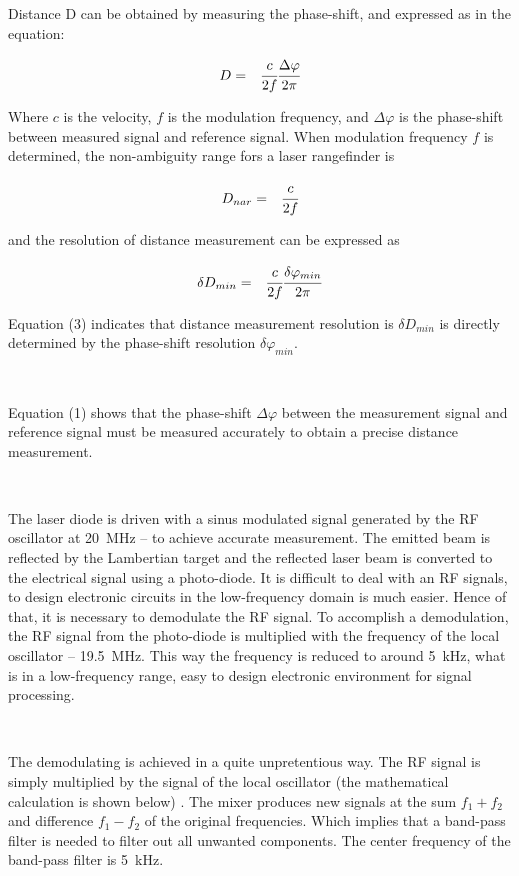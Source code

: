 \documentclass[fleqn]{article}
\begin{document}
Distance D can be obtained by measuring the phase-shift, and expressed as in the equation:

\begin{eqnarray}
    D&=&\cfrac{c}{2f}\cfrac{\Delta\varphi}{2\pi}
\end{eqnarray}

Where $c$ is the velocity, $f$ is the modulation frequency, and $\Delta\varphi$ is the phase-shift between measured signal and reference signal. When modulation frequency $f$ is determined, the non-ambiguity range fors a laser rangefinder is

\begin{eqnarray}
    D_{nar}&=&\cfrac{c}{2f}
\end{eqnarray}

and the resolution of distance measurement can be expressed as

\begin{eqnarray}
    \delta D_{min}&=&\cfrac{c}{2f}\cfrac{\delta\varphi_{min}}{2\pi}
\end{eqnarray}

Equation (3) indicates that distance measurement resolution is $\delta D_{min}$ is directly determined by the phase-shift resolution $\delta\varphi_{min}$.

~

Equation (1) shows that the phase-shift $\Delta\varphi$ between the measurement signal and reference signal must be measured accurately to obtain a precise distance measurement.

~

The laser diode is driven with a sinus modulated signal generated by the RF oscillator at 20 MHz – to achieve accurate measurement. The emitted beam is reflected by the Lambertian target and the reflected laser beam is converted to the electrical signal using a photo-diode. It is difficult to deal with an RF signals, to design electronic circuits in the low-frequency domain is much easier. Hence of that, it is necessary to demodulate the RF signal. To accomplish a demodulation, the  RF signal from the photo-diode is multiplied with the frequency of the local oscillator – 19.5 MHz. This way the frequency is reduced to around 5 kHz, what is in a low-frequency range, easy to design electronic environment for signal processing.

~

 The demodulating is achieved in a quite unpretentious way. The RF signal is simply multiplied by the signal of the local oscillator (the mathematical calculation is shown below) . The mixer produces  new signals at the sum $f_1 + f_2$ and difference $f_1 - f_2$ of the original frequencies. Which implies that a band-pass filter is needed to filter out all unwanted components. The center frequency of the band-pass filter is 5 kHz.
\end{document}
